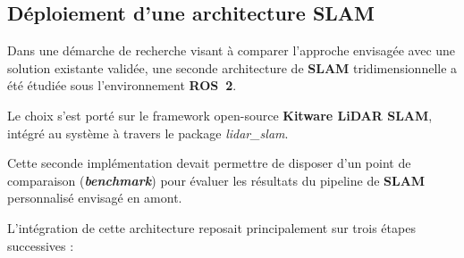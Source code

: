 \documentclass[12pt,a4paper,oneside]{report}
\begin{document}
\newpage

\subsection{Déploiement d'une architecture SLAM}

\hspace*{1cm}Dans une démarche de recherche visant à comparer l'approche envisagée avec une solution existante validée, une seconde architecture de \textbf{SLAM} tridimensionnelle a été étudiée sous l'environnement \textbf{ROS~2}.\vspace{0.05cm}

\hspace*{1cm}Le choix s'est porté sur le framework open-source \textbf{Kitware LiDAR SLAM}, intégré au système à travers le package \textit{lidar\_slam}.\vspace{0.05cm}

\hspace*{0.5cm}Cette seconde implémentation devait permettre de disposer d'un point de comparaison (\textbf{\textit{benchmark}}) pour évaluer les résultats du pipeline de \textbf{SLAM} personnalisé envisagé en amont.\vspace{0.05cm}

\hspace*{1cm}L'intégration de cette architecture reposait principalement sur trois étapes successives :\vspace{0.05cm}
\end{document}
